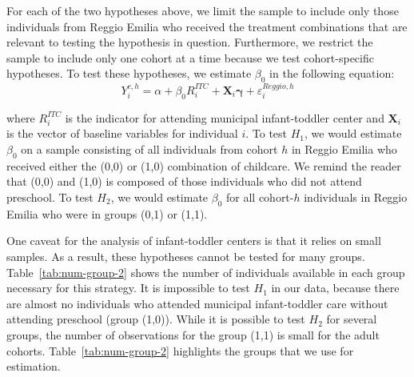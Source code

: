 For each of the two hypotheses above, we limit the sample to include only those individuals from Reggio Emilia who received the treatment combinations that are relevant to testing the hypothesis in question. Furthermore, we restrict the sample to include only one cohort at a time because we test cohort-specific hypotheses. To test these hypotheses, we estimate $\beta_{0}$ in the following equation:
\begin{equation}
Y_{i}^{c,h} = \alpha + \beta_{0}R_i^{ITC} + \mathbf{X}_i \bm{\gamma} + \varepsilon_{i}^{Reggio,h}
\end{equation}

where $R_i^{ITC}$ is the indicator for attending municipal infant-toddler center and $\mathbf{X}_i$ is the vector of baseline variables for individual $i$. To test $H_1$, we would estimate $\beta_0$ on a sample consisting of all individuals from cohort $h$ in Reggio Emilia who received either the (0,0) or (1,0) combination of childcare. We remind the reader that (0,0) and (1,0) is composed of those individuals who did not attend preschool. To test $H_2$, we would estimate $\beta_0$ for all cohort-$h$ individuals in Reggio Emilia who were in groups (0,1) or (1,1). 

One caveat for the analysis of infant-toddler centers is that it relies on small samples. As a result, these hypotheses cannot be tested for many groups. Table~\ref{tab:num-group-2} shows the number of individuals available in each group necessary for this strategy. It is impossible to test $H_1$ in our data, because there are almost no individuals who attended municipal infant-toddler care without attending preschool (group (1,0)). While it is possible to test $H_2$ for several groups, the number of observations for the group (1,1) is small for the adult cohorts. Table~\ref{tab:num-group-2} highlights the groups that we use for estimation. 

\begin{table}[H] \caption{Number of Individuals in Each Group} \label{tab:num-group-2}
\end{table}

